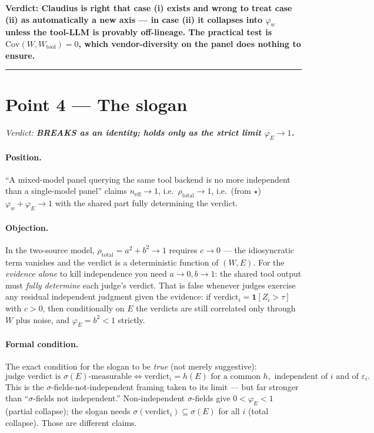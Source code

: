\documentclass[11pt,a4paper]{article}
\begin{document}
\textbf{Verdict: Claudius is right that case (i) exists and wrong to treat case (ii) as
automatically a new axis --- in case (ii) it collapses into $\varphi_w$ unless the tool-LLM is
provably off-lineage. The practical test is $\mathrm{Cov}(W, W_{\mathrm{tool}}) = 0$, which
vendor-diversity on the panel does nothing to ensure.}

\bigskip
\hrule
\bigskip

\section*{Point 4 --- The slogan}

\noindent\textit{Verdict: \textbf{BREAKS as an identity; holds only as the strict limit
$\varphi_E \to 1$.}}

\medskip

\paragraph{Position.}
``A mixed-model panel querying the same tool backend is no more independent than a single-model
panel'' claims $n_{\mathrm{eff}} \to 1$, i.e.\ $\rho_{\mathrm{total}} \to 1$, i.e.\
(from $\star$) $\varphi_w + \varphi_E \to 1$ with the shared part fully determining the verdict.

\paragraph{Objection.}
In the two-source model, $\rho_{\mathrm{total}} = a^2 + b^2 \to 1$ requires $c \to 0$ ---
the idiosyncratic term vanishes and the verdict is a deterministic function of $(W,E)$.
For the \emph{evidence alone} to kill independence you need $a \to 0, b \to 1$: the shared tool
output must \emph{fully determine} each judge's verdict.
That is false whenever judges exercise any residual independent judgment given the evidence:
if $\mathrm{verdict}_i = \mathbf{1}[Z_i > \tau]$ with $c > 0$, then conditionally on $E$ the
verdicts are still correlated only through $W$ plus noise, and $\varphi_E = b^2 < 1$ strictly.

\paragraph{Formal condition.}
The exact condition for the slogan to be \emph{true} (not merely suggestive):
\[
  \text{judge verdict is } \sigma(E)\text{-measurable}
  \iff
  \mathrm{verdict}_i = h(E) \text{ for a common } h,
  \text{ independent of } i \text{ and of } \varepsilon_i.
\]
This is the $\sigma$-fields-not-independent framing taken to its limit --- but far stronger than
``$\sigma$-fields not independent.''
Non-independent $\sigma$-fields give $0 < \varphi_E < 1$ (partial collapse);
the slogan needs $\sigma(\mathrm{verdict}_i) \subseteq \sigma(E)$ for all $i$ (total collapse).
Those are different claims.
\end{document}
